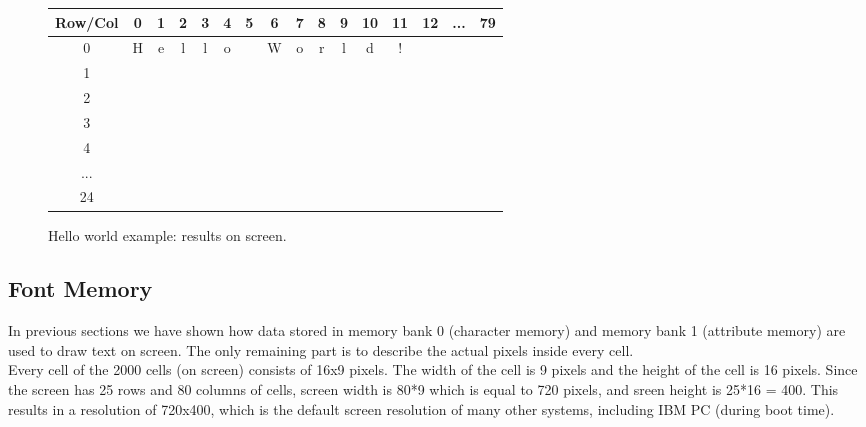 \documentclass[oneside]{book}
\begin{document}
\begin{figure}[H]
\begin{center}
\begin{tabular}{|c|c|c|c|c|c|c|c|c|c|c|c|c|c|c|c|}

\hline Row/Col & 0 & 1 & 2 & 3 & 4 & 5 & 6 & 7 & 8 & 9 & 10 & 11 & 12 & ... & 79 \\

\hline 0 & \cellcolor{blue}\color{white} H &
           \cellcolor{blue}\color{white} e &
           \cellcolor{blue}\color{white} l &
           \cellcolor{blue}\color{white} l &
           \cellcolor{blue}\color{white} o &
           \cellcolor{blue}\color{white}   &
           \cellcolor{blue}\color{white} W &
           \cellcolor{blue}\color{white} o &
           \cellcolor{blue}\color{white} r &
           \cellcolor{blue}\color{white} l &
           \cellcolor{blue}\color{white} d &
           \cellcolor{blue}\color{white} ! &
           \cellcolor{black} &
           \cellcolor{black} &
           \cellcolor{black} \\

\hline 1 & \multicolumn{15}{|c|}{\cellcolor{black}}\\
\hline 2 & \multicolumn{15}{|c|}{\cellcolor{black}}\\
\hline 3 & \multicolumn{15}{|c|}{\cellcolor{black}}\\
\hline 4 & \multicolumn{15}{|c|}{\cellcolor{black}}\\
\hline ... & \multicolumn{15}{|c|}{\cellcolor{black}}\\
\hline 24 & \multicolumn{15}{|c|}{\cellcolor{black}}\\

\hline

\end{tabular}
\end{center}
\caption{Hello world example: results on screen.}
\label{hw3}
\end{figure}

\subsection{Font Memory}

In previous sections we have shown how data stored in memory bank 0 (character
memory) and memory bank 1 (attribute memory) are used to draw text on screen.
The only remaining part is to describe the actual pixels inside every cell.\\

Every cell of the 2000 cells (on screen) consists of 16x9 pixels.
The width of the cell is 9 pixels and the height of the cell is 16 pixels.
Since the screen has 25 rows and 80 columns of cells, screen width is 80*9
which is equal to 720 pixels, and sreen height is 25*16 = 400.
This results in a resolution of 720x400, which is the default screen resolution
of many other systems, including IBM PC (during boot time).\\
\end{document}
